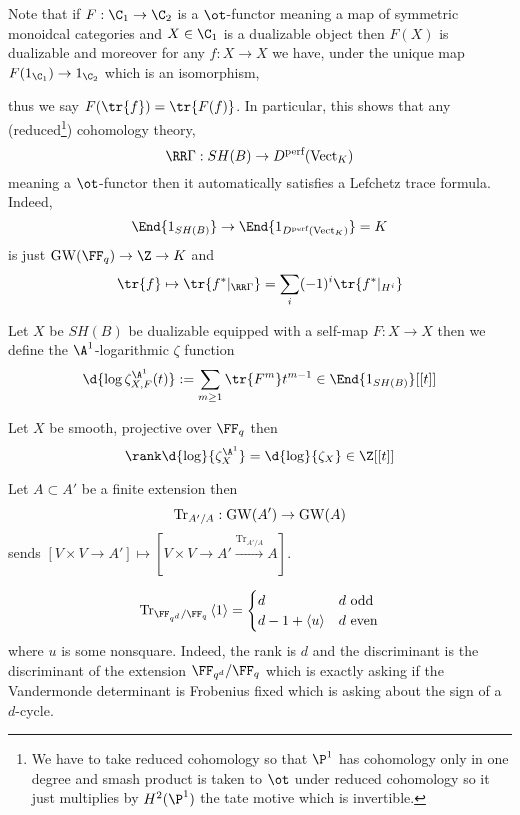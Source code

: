 \documentclass{article}
\begin{document}
Note that if $F : \C_1 \to \C_2$ is a $\ot$-functor meaning a map of symmetric monoidcal categories and $X \in \C_1$ is a dualizable object then $F(X)$ is dualizable and moreover for any $f : X \to X$ we have, under the unique map $F(1_{\C_1}) \to 1_{\C_2}$ which is an isomorphism,
\begin{center}
\end{center}
thus we say $F(\tr{f}) = \tr{F(f)}$. In particular, this shows that any (reduced\footnote{We have to take reduced cohomology so that $\P^1$ has cohomology only in one degree and smash product is taken to $\ot$ under reduced cohomology so it just multiplies by $H^2(\P^1)$ the tate motive which is invertible.}) cohomology theory,
\[ \RR \Gamma : SH(B) \to D^{\text{perf}}(\mathrm{Vect}_K) \]
meaning a $\ot$-functor then it automatically satisfies a Lefchetz trace formula. Indeed, 
\[ \End{1_{SH(B)}} \to \End{1_{D^{\text{perf}}(\mathrm{Vect}_K)}} = K \]
is just $\GW(\FF_q) \to \Z \to K$ and
\[ \tr{f} \mapsto \tr{f^*|_{\RR \Gamma}} = \sum_{i} (-1)^i \tr{f^*|_{H^i}} \]

\begin{defn}
Let $X$ be $SH(B)$ be dualizable equipped with a self-map $F : X \to X$ then we define the $\A^1$-logarithmic $\zeta$ function
\[ \d{\log{\zeta^{\A^1}_{X,F}}(t)} := \sum_{m \ge 1} \tr{F^m} t^{m-1} \in \End{1_{SH(B)}}[[t]] \]
\end{defn}

\begin{prop}
Let $X$ be smooth, projective over $\FF_q$ then
\[ \rank \d{\log}{\zeta^{\A^1}_X} = \d{\log}{\zeta_X} \in \Z[[t]] \]
\end{prop}

\renewcommand{\Tr}{\mathrm{Tr}}

Let $A \subset A'$ be a finite \etale extension then
\[ \Tr_{A'/A} : \GW(A') \to \GW(A) \]
sends $[V \times V \to A'] \mapsto [V \times V \to A' \xrightarrow{\Tr_{A'/A}} A]$.

\begin{example}
\[ \Tr_{\FF_{q^d} / \FF_q} \left< 1 \right> = 
\begin{cases}
d & d \text{ odd}
\\
d - 1 + \left< u \right> & d \text{ even} 
\end{cases} \]
where $u$ is some nonsquare. 
Indeed, the rank is $d$ and the discriminant is the discriminant of the extension $\FF_{q^d} / \FF_q$ which is exactly asking if the Vandermonde determinant is Frobenius fixed which is asking about the sign of a $d$-cycle.
\end{example}
\end{document}
